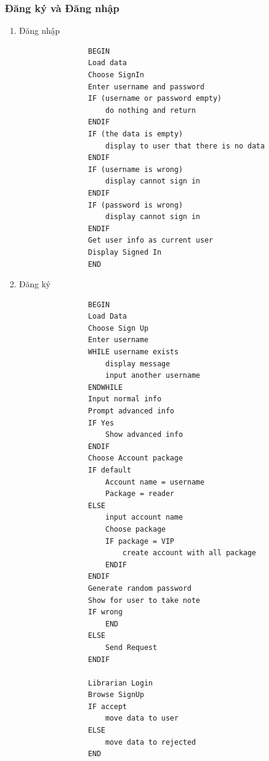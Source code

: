 \documentclass[12pt,a4paper]{report}
\begin{document}
            \subsubsection{Đăng ký và Đăng nhập}
            \begin{enumerate}
                \item Đăng nhập
                \begin{verbatim}
                BEGIN
                Load data
                Choose SignIn
                Enter username and password
                IF (username or password empty)
                    do nothing and return
                ENDIF
                IF (the data is empty)
                    display to user that there is no data
                ENDIF
                IF (username is wrong)
                    display cannot sign in
                ENDIF
                IF (password is wrong)
                    display cannot sign in
                ENDIF
                Get user info as current user
                Display Signed In
                END
                \end{verbatim}
                \newpage
                \item Đăng ký
                \begin{verbatim}
                BEGIN
                Load Data
                Choose Sign Up
                Enter username
                WHILE username exists
                    display message
                    input another username
                ENDWHILE
                Input normal info
                Prompt advanced info
                IF Yes
                    Show advanced info
                ENDIF
                Choose Account package
                IF default
                    Account name = username
                    Package = reader
                ELSE 
                    input account name
                    Choose package
                    IF package = VIP
                        create account with all package
                    ENDIF
                ENDIF
                Generate random password
                Show for user to take note
                IF wrong 
                    END
                ELSE 
                    Send Request
                ENDIF

                Librarian Login
                Browse SignUp
                IF accept
                    move data to user
                ELSE 
                    move data to rejected
                END
                \end{verbatim}
            \end{enumerate}
            \newpage
\end{document}
